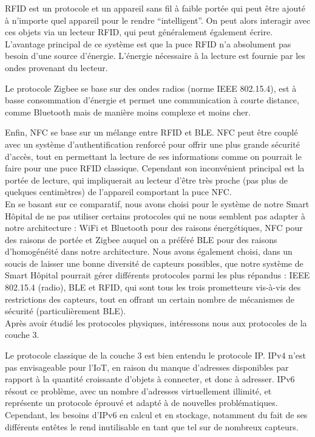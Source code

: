 \documentclass{article}
\begin{document}
RFID est un protocole et un appareil sans fil à faible portée qui peut être ajouté à n’importe quel appareil pour le rendre “intelligent”. On peut alors interagir avec ces objets via un lecteur RFID, qui peut généralement également écrire. L’avantage principal de ce système est que la puce RFID n’a absolument pas besoin d’une source d’énergie. L’énergie nécessaire à la lecture est fournie par les ondes provenant du lecteur.

Le protocole Zigbee se base sur des ondes radios (norme IEEE 802.15.4), est à basse consommation d’énergie et permet une communication à courte distance, comme Bluetooth mais de manière moins complexe et moins cher.

Enfin, NFC \cite{NFC} se base sur un mélange entre RFID et BLE. NFC peut être couplé avec un système d’authentification renforcé pour offrir une plus grande sécurité d’accès, tout en permettant la lecture de ses informations comme on pourrait le faire pour une puce RFID classique. Cependant son inconvénient principal est la portée de lecture, qui impliquerait au lecteur d'être très proche (pas plus de quelques centimètres) de l’appareil comportant la puce NFC.
\\

En se basant sur ce comparatif, nous avons choisi pour le système de notre Smart Hôpital de ne pas utiliser certains protocoles qui ne nous semblent pas adapter à notre architecture : WiFi et Bluetooth pour des raisons énergétiques, NFC pour des raisons de portée et Zigbee auquel on a préféré BLE pour des raisons d'homogénéité dans notre architecture. Nous avons également choisi, dans un soucis de laisser une bonne diversité de capteurs possibles, que notre système de Smart Hôpital pourrait gérer différents protocoles parmi les plus répandus : IEEE 802.15.4 (radio), BLE et RFID, qui sont tous les trois prometteurs vis-à-vis des restrictions des capteurs, tout en offrant un certain nombre de mécanismes de sécurité (particulièrement BLE).
\\

Après avoir étudié les protocoles physiques, intéressons nous aux protocoles de la couche 3.

Le protocole classique de la couche 3 est bien entendu le protocole IP. IPv4 n’est pas envisageable pour l’IoT, en raison du manque d’adresses disponibles par rapport à la quantité croissante d’objets à connecter, et donc à adresser. IPv6 \cite{jara2013internet} résout ce problème, avec un nombre d’adresses virtuellement illimité, et représente un protocole éprouvé et adapté à de nouvelles problématiques. Cependant, les besoins d’IPv6 en calcul et en stockage, notamment du fait de ses différents entêtes le rend inutilisable en tant que tel sur de nombreux capteurs.
\end{document}

